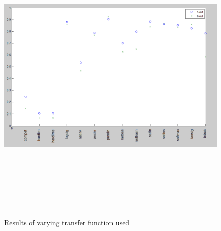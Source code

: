 \documentclass[a4paper]{article}
\begin{document}
\begin{landscape}
\begin{figure}[p]
  \centering
  {\includegraphics[height=140mm]{transfer-function.png}}
  \caption{Results of varying transfer function used}
\end{figure}
\end{landscape}
\end{document}
